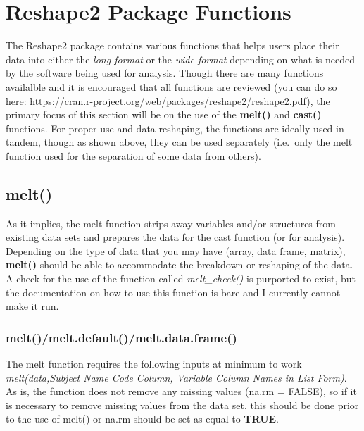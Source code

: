 \documentclass[]{book}
\begin{document}
\hypertarget{reshape2-package-functions}{%
\section{Reshape2 Package Functions}\label{reshape2-package-functions}}

The Reshape2 package contains various functions that helps users place their data into either the \emph{long format} or the \emph{wide format} depending on what is needed by the software being used for analysis. Though there are many functions availalble and it is encouraged that all functions are reviewed (you can do so here: \url{https://cran.r-project.org/web/packages/reshape2/reshape2.pdf}), the primary focus of this section will be on the use of the \textbf{melt()} and \textbf{cast()} functions. For proper use and data reshaping, the functions are ideally used in tandem, though as shown above, they can be used separately (i.e.~only the melt function used for the separation of some data from others).

\hypertarget{melt}{%
\subsection{melt()}\label{melt}}

As it implies, the melt function strips away variables and/or structures from existing data sets and prepares the data for the cast function (or for analysis). Depending on the type of data that you may have (array, data frame, matrix), \textbf{melt()} should be able to accommodate the breakdown or reshaping of the data. A check for the use of the function called \emph{melt\_check()} is purported to exist, but the documentation on how to use this function is bare and I currently cannot make it run.

\hypertarget{meltmelt.defaultmelt.data.frame}{%
\subsubsection{melt()/melt.default()/melt.data.frame()}\label{meltmelt.defaultmelt.data.frame}}

The melt function requires the following inputs at minimum to work \emph{melt(data,Subject Name Code Column, Variable Column Names in List Form)}. As is, the function does not remove any missing values (na.rm = FALSE), so if it is necessary to remove missing values from the data set, this should be done prior to the use of melt() or na.rm should be set as equal to \textbf{TRUE}.
\end{document}
